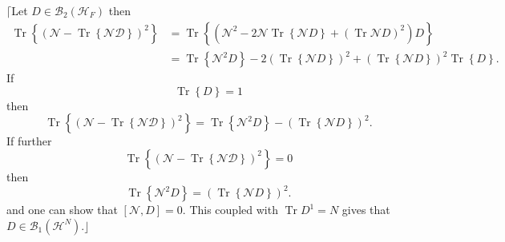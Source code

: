 \documentclass[aps,preprint]{revtex4}%
\begin{document}
$\lceil$Let $D\in\mathcal{B}_{2}\left(  \mathcal{H}_{F}\right)  $ then
\begin{align}
\operatorname{Tr}\left\{  \left(  \mathcal{N}-\operatorname{Tr}\left\{
\mathcal{ND}\right\}  \right)  ^{2}\right\}   &  =\operatorname{Tr}\left\{
\left(  \mathcal{N}^{2}-2\mathcal{N}\operatorname{Tr}\left\{  \mathcal{N}%
D\right\}  +\left(  \operatorname{Tr}\mathcal{N}D\right)  ^{2}\right)
D\right\} \nonumber\\
&  =\operatorname{Tr}\left\{  \mathcal{N}^{2}D\right\}  -2\left(
\operatorname{Tr}\left\{  \mathcal{N}D\right\}  \right)  ^{2}+\left(
\operatorname{Tr}\left\{  \mathcal{N}D\right\}  \right)  ^{2}\operatorname{Tr}%
\left\{  D\right\}  .
\end{align}
If
\begin{equation}
\operatorname{Tr}\left\{  D\right\}  =1
\end{equation}
then
\begin{equation}
\operatorname{Tr}\left\{  \left(  \mathcal{N}-\operatorname{Tr}\left\{
\mathcal{ND}\right\}  \right)  ^{2}\right\}  =\operatorname{Tr}\left\{
\mathcal{N}^{2}D\right\}  -\left(  \operatorname{Tr}\left\{  \mathcal{N}%
D\right\}  \right)  ^{2}.
\end{equation}
If further
\begin{equation}
\operatorname{Tr}\left\{  \left(  \mathcal{N}-\operatorname{Tr}\left\{
\mathcal{ND}\right\}  \right)  ^{2}\right\}  =0
\end{equation}
then
\begin{equation}
\operatorname{Tr}\left\{  \mathcal{N}^{2}D\right\}  =\left(  \operatorname{Tr}%
\left\{  \mathcal{N}D\right\}  \right)  ^{2}.
\end{equation}
and one can show that $\left[  \mathcal{N},D\right]  =0.$ This coupled with
$\operatorname{Tr}D^{1}=N$ gives that $D\in\mathcal{B}_{1}\left(
\mathcal{H}^{N}\right)  .\rfloor$
\end{document}
